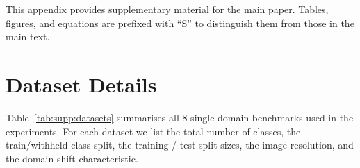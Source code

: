 \documentclass[runningheads]{llncs}
\newcommand{\tabref}[1]{Table~\ref{#1}}
\begin{document}
\setcounter{table}{0}
\setcounter{figure}{0}
\setcounter{equation}{0}
\renewcommand{\thetable}{S\arabic{table}}
\renewcommand{\thefigure}{S\arabic{figure}}
\renewcommand{\theequation}{S\arabic{equation}}

\noindent This appendix provides supplementary material for the main paper.
Tables, figures, and equations are prefixed with ``S'' to distinguish them from
those in the main text.

\section{Dataset Details}
\label{sec:supp:datasets}

\tabref{tab:supp:datasets} summarises all 8 single-domain benchmarks used in the
experiments.  For each dataset we list the total number of classes, the train/withheld
class split, the training / test split sizes, the image resolution, and the domain-shift
characteristic.
\end{document}
